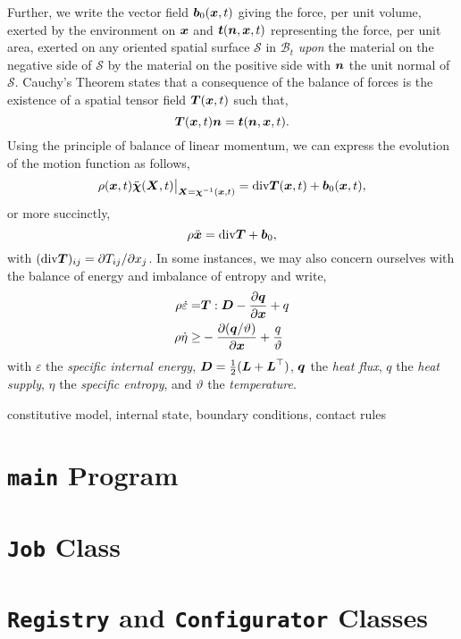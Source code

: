 Further, we write the vector field $\boldsymbol{b}_0(\boldsymbol{x},t)$ giving the force, per unit volume, exerted by the environment on $\boldsymbol{x}$ and $\boldsymbol{t}(\boldsymbol{n},\boldsymbol{x},t)$ representing the force, per unit area, exerted on any oriented spatial surface $\mathcal{S}$ in $\mathcal{B}_t$ \textit{upon} the material on the negative side of $\mathcal{S}$ by the material on the positive side with $\boldsymbol{n}$ the unit normal of $\mathcal{S}$. Cauchy's Theorem states that a consequence of the balance of forces is the existence of a spatial tensor field $\boldsymbol{T}(\boldsymbol{x},t)$ such that,
$$\boldsymbol{T}(\boldsymbol{x},t)\boldsymbol{n} = \boldsymbol{t}(\boldsymbol{n},\boldsymbol{x},t).$$
Using the principle of balance of linear momentum, we can express the evolution of the motion function as follows,
$$\rho(\boldsymbol{x},t) \ddot{\boldsymbol{\chi}}(\boldsymbol{X},t)\big|_{\boldsymbol{X}=\boldsymbol{\chi}^{-1}(\boldsymbol{x},t)} = \mathrm{div}\boldsymbol{T}(\boldsymbol{x},t) + \boldsymbol{b}_0(\boldsymbol{x},t),$$
or more succinctly,
$$\rho \ddot{\boldsymbol{x}} = \mathrm{div}\boldsymbol{T} + \boldsymbol{b}_0,$$
with $(\mathrm{div}\boldsymbol{T})_{ij} = \partial T_{ij}/\partial x_j$. In some instances, we may also concern ourselves with the balance of energy and imbalance of entropy and write,
$$
\begin{aligned}
\rho \dot{\varepsilon} =& \boldsymbol{T}:\boldsymbol{D} - \frac{\partial \boldsymbol{q}}{\partial \boldsymbol{x}} + q\\
\rho \dot{\eta} \geq& -\frac{\partial (\boldsymbol{q}/\vartheta)}{\partial \boldsymbol{x}} + \frac{q}{\vartheta}
\end{aligned}
$$
with $\varepsilon$ the \textit{specific internal energy}, $\boldsymbol{D} = \tfrac{1}{2}(\boldsymbol{L} + \boldsymbol{L}^{\top})$, $\boldsymbol{q}$ the \textit{heat flux}, $q$ the \textit{heat supply}, $\eta$ the \textit{specific entropy}, and $\vartheta$ the \textit{temperature}.

constitutive model, internal state, boundary conditions, contact rules

\section{\texttt{main} Program}

\section{\texttt{Job} Class}

\section{\texttt{Registry} and \texttt{Configurator} Classes}

